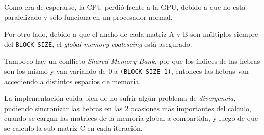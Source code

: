 Como era de esperarse, la CPU perdió frente a la GPU,
debido a que no está paralelizado y sólo funciona en un procesador
normal.

Por otro lado, debido a que el ancho de cada matriz A y B
son múltiplos siempre del \texttt{BLOCK\_SIZE}, el
\emph{global memory coalescing} está asegurado.

Tampoco hay un conflicto \emph{Shared Memory Bank}, por que los índices
de las hebras son los mismo y van variando de 0 a \texttt{(BLOCK\_SIZE-1)},
entonces las hebras van accediendo a distintos espacios de memoria.

La implementación cuida bien de no sufrir algún problema de \emph{divergencia},
pudiendo sincronizar las hebras en las 2 ocasiones más importantes
del cálculo, cuando se cargan las matrices de la memoria global a compartida,
y luego de que se calculo la sub-matriz C en cada iteración.
